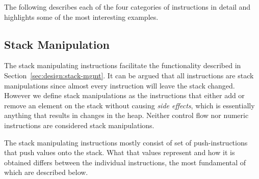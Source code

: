 The following describes each of the four categories of instructions in detail
and highlights some of the most interesting examples.

\subsection{Stack Manipulation}

The stack manipulating instructions facilitate the functionality described in
Section~\ref{sec:design:stack-mgmt}. It can be argued that all instructions are
stack manipulations since almost every instruction will leave the stack
changed. However we define stack manipulations as the instructions that either
add or remove an element on the stack without causing \textit{side effects},
which is essentially anything that results in changes in the heap. Neither
control flow nor numeric instructions are considered stack manipulations.

The stack manipulating instructions mostly consist of set of push-instructions
that push values onto the stack. What that values represent and how it is
obtained differs between the individual instructions, the most fundamental of
which are described below.


